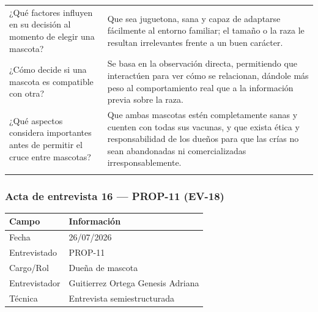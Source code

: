 \documentclass[journal,onecolumn]{IEEEtran}
\begin{document}
{\begin{longtable}{@{}p{5.6cm} p{9.4cm}@{}}
			¿Qué factores influyen en su decisión al momento de elegir una mascota? & Que sea juguetona, sana y capaz de adaptarse fácilmente al entorno familiar; el tamaño o la raza le resultan irrelevantes frente a un buen carácter. \\ \addlinespace
			
			¿Cómo decide si una mascota es compatible con otra? & Se basa en la observación directa, permitiendo que interactúen para ver cómo se relacionan, dándole más peso al comportamiento real que a la información previa sobre la raza. \\ \addlinespace
			
			¿Qué aspectos considera importantes antes de permitir el cruce entre mascotas? & Que ambas mascotas estén completamente sanas y cuenten con todas sus vacunas, y que exista ética y responsabilidad de los dueños para que las crías no sean abandonadas ni comercializadas irresponsablemente. \\ \addlinespace
			
		\end{longtable}
	}
	
	
	\subsubsection*{Acta de entrevista 16 --- PROP-11 (EV-18)}
	
	\begin{table}[H]
		\centering\small
		\begin{tabularx}{\textwidth}{@{}l X@{}}
			\toprule
			\textbf{Campo} & \textbf{Información} \\
			\midrule
			
			Fecha & 26/07/2026 \\
			
			Entrevistado & PROP-11 \\
			
			Cargo/Rol & Dueña de mascota \\
			
			Entrevistador & Guitierrez Ortega Genesis Adriana \\
			
			Técnica & Entrevista semiestructurada \\
			
			\bottomrule
		\end{tabularx}
	\end{table}
	
\end{document}

